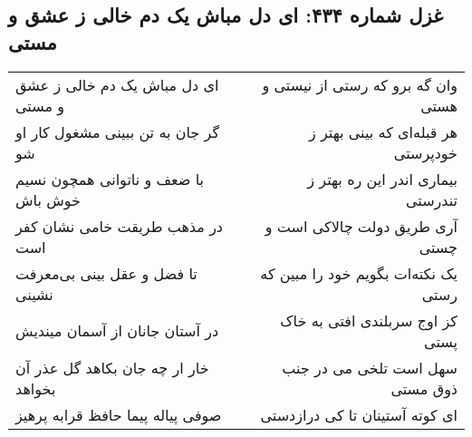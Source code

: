 \begin{center}
\section*{غزل شماره ۴۳۴: ای دل مباش یک دم خالی ز عشق و مستی}
\label{sec:sh434}
\begin{longtable}{l p{0.5cm} r}
ای دل مباش یک دم خالی ز عشق و مستی
&&
وان گه برو که رستی از نیستی و هستی
\\
گر جان به تن ببینی مشغول کار او شو
&&
هر قبله‌ای که بینی بهتر ز خودپرستی
\\
با ضعف و ناتوانی همچون نسیم خوش باش
&&
بیماری اندر این ره بهتر ز تندرستی
\\
در مذهب طریقت خامی نشان کفر است
&&
آری طریق دولت چالاکی است و چستی
\\
تا فضل و عقل بینی بی‌معرفت نشینی
&&
یک نکته‌ات بگویم خود را مبین که رستی
\\
در آستان جانان از آسمان میندیش
&&
کز اوج سربلندی افتی به خاک پستی
\\
خار ار چه جان بکاهد گل عذر آن بخواهد
&&
سهل است تلخی می در جنب ذوق مستی
\\
صوفی پیاله پیما حافظ قرابه پرهیز
&&
ای کوته آستینان تا کی درازدستی
\\
\end{longtable}
\end{center}
